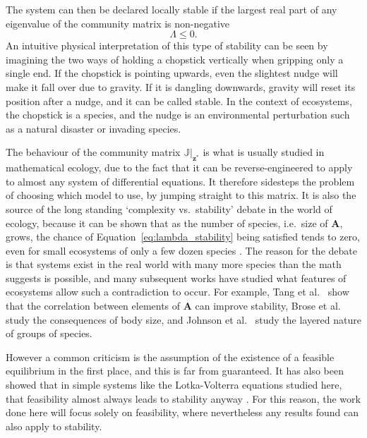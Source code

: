 The system can then be declared locally stable if the largest real part of any eigenvalue of the community matrix is non-negative
\begin{equation}
    \Lambda \leq 0.
    \label{eq:lambda_stability}
\end{equation}
An intuitive physical interpretation of this type of stability can be seen by imagining the two ways of holding a chopstick vertically when gripping only a single end. If the chopstick is pointing upwards, even the slightest nudge will make it fall over due to gravity. If it is dangling downwards, gravity will reset its position after a nudge, and it can be called stable.
In the context of ecosystems, the chopstick is a species, and the nudge is an environmental perturbation such as a natural disaster or invading species.

The behaviour of the community matrix $\mathbb{J}|_\mathbf{z^*}$ is what is usually studied in mathematical ecology, due to the fact that it can be reverse-engineered to apply to almost any system of differential equations. It therefore sidesteps the problem of choosing which model to use, by jumping straight to this matrix.
It is also the source of the long standing `complexity vs.\ stability' debate in the world of ecology, because it can be shown that as the number of species, i.e.\ size of $\mathbf{A}$, grows, the chance of Equation~\eqref{eq:lambda_stability} being satisfied tends to zero, even for small ecosystems of only a few dozen species \cite{May1973}.
The reason for the debate is that systems exist in the real world with many more species than the math suggests is possible, and many subsequent works have studied what features of ecosystems allow such a contradiction to occur.
For example, Tang et al.\ \cite{Tang2014Correlation} show that the correlation between elements of $\mathbf{A}$ can improve stability, Brose et al.\ \cite{Brose2006} study the consequences of body size, and Johnson et al.\ \cite{Johnson2014} study the layered nature of groups of species.

However a common criticism is the assumption of the existence of a feasible equilibrium in the first place, and this is far from guaranteed. It has also been showed that in simple systems like the Lotka-Volterra equations studied here, that feasibility almost always leads to stability anyway \cite{Dougoud2018}. For this reason, the work done here will focus solely on feasibility, where nevertheless any results found can also apply to stability.


